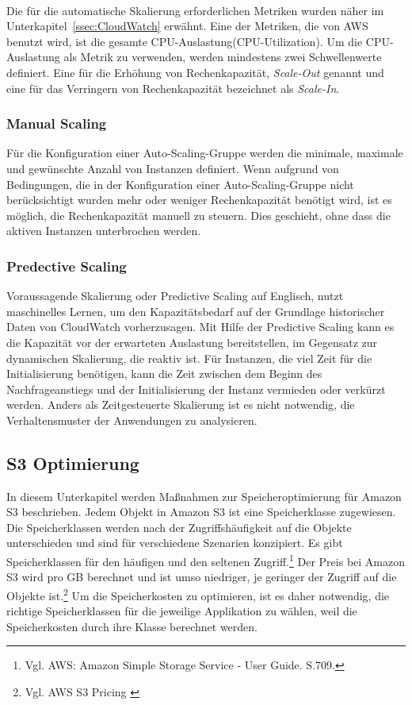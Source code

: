 \\
Die für die automatische Skalierung erforderlichen Metriken wurden näher im Unterkapitel~\ref{ssec:CloudWatch} erwähnt. Eine der Metriken, die von AWS %
benutzt wird, ist die gesamte CPU-Auslastung(CPU-Utilization). 
Um die CPU-Auslastung als Metrik zu verwenden, werden mindestens zwei Schwellenwerte definiert. Eine für die Erhöhung von Rechenkapazität, \textit{Scale-Out} genannt und eine für das Verringern von Rechenkapazität bezeichnet als \textit{Scale-In}.

\subsubsection{Manual Scaling}
Für die Konfiguration einer Auto-Scaling-Gruppe werden die minimale, maximale und gewünschte Anzahl von Instanzen definiert. Wenn aufgrund von Bedingungen, die in der Konfiguration einer Auto-Scaling-Gruppe nicht berücksichtigt wurden mehr oder weniger Rechenkapazität benötigt wird, ist es möglich, die Rechenkapazität manuell zu steuern. Dies geschieht, ohne dass die aktiven Instanzen unterbrochen werden.

\subsubsection{Predective Scaling}%
Voraussagende Skalierung oder Predictive Scaling auf Englisch, nutzt maschinelles Lernen, um den Kapazitätsbedarf auf der Grundlage historischer Daten von CloudWatch vorherzusagen. Mit Hilfe der Predictive Scaling kann es die Kapazität vor der erwarteten Auslastung bereitstellen, im Gegensatz zur dynamischen Skalierung, die reaktiv ist. 
Für Instanzen, die viel Zeit für die Initialisierung benötigen, kann die Zeit zwischen dem Beginn des Nachfrageanstiegs und der Initialisierung der Instanz vermieden oder verkürzt werden.
Anders als Zeitgesteuerte Skalierung ist es nicht notwendig, die Verhaltensmuster der Anwendungen zu analysieren.

\subsection{S3 Optimierung}
In diesem Unterkapitel werden Maßnahmen zur Speicheroptimierung für Amazon S3 beschrieben. Jedem Objekt in Amazon S3 ist eine Speicherklasse zugewiesen. Die Speicherklassen werden nach der Zugriffshäufigkeit auf die Objekte unterschieden und sind für verschiedene Szenarien konzipiert. Es gibt Speicherklassen für den häufigen und den seltenen Zugriff.\footnote{Vgl. AWS: Amazon Simple Storage Service - User Guide. S.709.\cite{AMZ18}} Der Preis bei Amazon S3 wird pro GB berechnet und ist umso niedriger, je geringer der Zugriff auf die Objekte ist.\footnote{Vgl. AWS S3 Pricing \cite{AMZ09}} Um die Speicherkosten zu optimieren, ist es daher notwendig, die richtige Speicherklassen für die jeweilige Applikation zu wählen, weil die Speicherkosten durch ihre Klasse berechnet werden.

